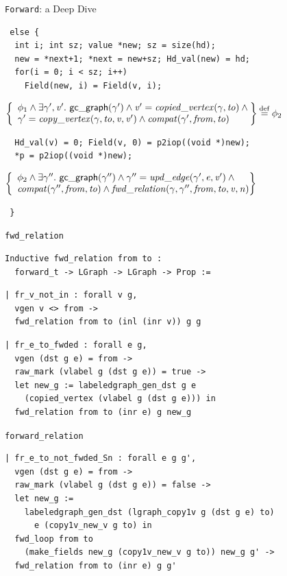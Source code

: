 \documentclass[usenames, xcolor=dvipsnames]{beamer}
\makeatletter
\newcommand{\defeq}{\mathbin{\overset{\mathrm{def}}{=}}}
\newcommand{\braces}[1]{\left\{\begin{array}{l@{}} #1 \end{array}\right\}}
\newcommand{\m}[1]{\ensuremath{\mathit{#1}}} %
\newcommand{\p}[1]{\ensuremath{\mathsf{#1}}} %
\makeatother
\begin{document}
\begin{frame}[fragile]{\texttt{Forward}: a Deep Dive}
\begin{Verbatim}
 else {
  int i; int sz; value *new; sz = size(hd); 
  new = *next+1; *next = new+sz; Hd_val(new) = hd;
  for(i = 0; i < sz; i++)
    Field(new, i) = Field(v, i);
\end{Verbatim}
\pause
$\braces{\phi_{1} \wedge \exists \ga', \m{v'}.~\p{gc\_graph}(\ga') \wedge 
\m{v'} = \m{copied\_vertex(\ga, \m{to})} \wedge \null \\ \ga' = \m{copy\_vertex}(\gamma, \m{to}, \m{v}, \m{v'}) \wedge \m{compat}(\ga', \m{from}, \m{to})} \defeq \phi_{2}$
\pause
\begin{Verbatim}
  Hd_val(v) = 0; Field(v, 0) = p2iop((void *)new);
  *p = p2iop((void *)new);
\end{Verbatim}
\pause
$\braces{\phi_{2} \wedge \exists \ga''.~\p{gc\_graph}(\ga'') \wedge \ga'' = \m{upd\_edge}(\ga', \m{e}, \m{v'}) \wedge \null \\ 
\m{compat}(\ga'', \m{from}, \m{to}) \wedge \m{fwd\_relation}(\ga, \ga'', \m{from}, \m{to}, \m{v}, \m{n})}$
\begin{Verbatim}
 }
\end{Verbatim}
\end{frame}

\begin{frame}[fragile]{\texttt{fwd\_relation}}
\begin{Verbatim}
Inductive fwd_relation from to : 
  forward_t -> LGraph -> LGraph -> Prop :=
\end{Verbatim}
\pause
\begin{Verbatim}
| fr_v_not_in : forall v g,
  vgen v <> from ->
  fwd_relation from to (inl (inr v)) g g
\end{Verbatim}
\pause
\begin{Verbatim}
| fr_e_to_fwded : forall e g,
  vgen (dst g e) = from ->
  raw_mark (vlabel g (dst g e)) = true ->
  let new_g := labeledgraph_gen_dst g e
    (copied_vertex (vlabel g (dst g e))) in
  fwd_relation from to (inr e) g new_g
\end{Verbatim}
\end{frame}

\begin{frame}[fragile]{\texttt{forward\_relation}}
\begin{Verbatim}
| fr_e_to_not_fwded_Sn : forall e g g', 
  vgen (dst g e) = from ->
  raw_mark (vlabel g (dst g e)) = false -> 
  let new_g :=
    labeledgraph_gen_dst (lgraph_copy1v g (dst g e) to)
      e (copy1v_new_v g to) in 
  fwd_loop from to
    (make_fields new_g (copy1v_new_v g to)) new_g g' ->
  fwd_relation from to (inr e) g g'
\end{Verbatim} 
\end{frame}
\end{document}

